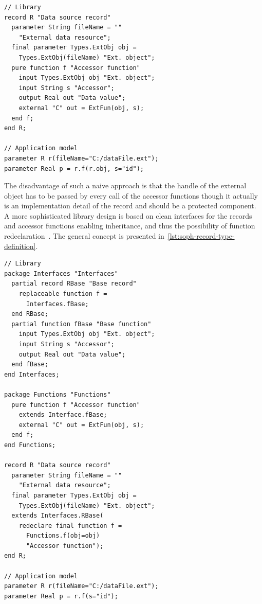 \documentclass{modelica}
\begin{document}
\begin{lstlisting}[caption=Naive record type definition, label=lst:naive-record-type-definition, language=modelica]
// Library
record R "Data source record"
  parameter String fileName = ""
    "External data resource";
  final parameter Types.ExtObj obj =
    Types.ExtObj(fileName) "Ext. object";
  pure function f "Accessor function"
    input Types.ExtObj obj "Ext. object";
    input String s "Accessor";
    output Real out "Data value";
    external "C" out = ExtFun(obj, s);
  end f;
end R;

// Application model
parameter R r(fileName="C:/dataFile.ext");
parameter Real p = r.f(r.obj, s="id");
\end{lstlisting}

The disadvantage of such a naive approach is that the handle of the external object has to be passed by every call of the accessor functions though it actually is an implementation detail of the record and should be a protected component.
A more sophisticated library design is based on clean interfaces for the records and accessor functions enabling inheritance, and thus the possibility of function redeclaration~\cite{modelisax2018hints}.
The general concept is presented in~\autoref{lst:soph-record-type-definition}.

\begin{lstlisting}[caption=Sophisticated record type definition, label=lst:soph-record-type-definition, language=modelica]
// Library
package Interfaces "Interfaces"
  partial record RBase "Base record"
    replaceable function f =
      Interfaces.fBase;
  end RBase;
  partial function fBase "Base function"
    input Types.ExtObj obj "Ext. object";
    input String s "Accessor";
    output Real out "Data value";
  end fBase;
end Interfaces;

package Functions "Functions"
  pure function f "Accessor function"
    extends Interface.fBase;
    external "C" out = ExtFun(obj, s);
  end f;
end Functions;

record R "Data source record"
  parameter String fileName = ""
    "External data resource";
  final parameter Types.ExtObj obj =
    Types.ExtObj(fileName) "Ext. object";
  extends Interfaces.RBase(
    redeclare final function f =
      Functions.f(obj=obj)
      "Accessor function");
end R;

// Application model
parameter R r(fileName="C:/dataFile.ext");
parameter Real p = r.f(s="id");
\end{lstlisting}
\end{document}
